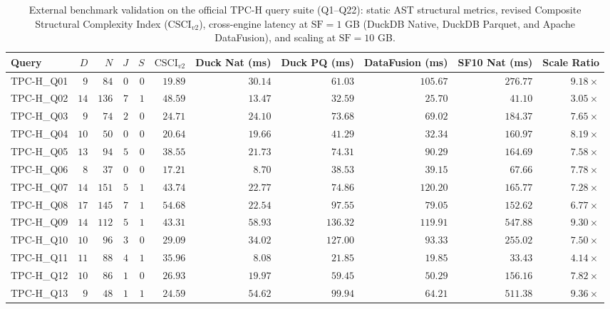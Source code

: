 \begin{table}[htbp]
\centering
\scriptsize
\setlength{\tabcolsep}{4.2pt}
\caption{External benchmark validation on the official TPC-H query suite (Q1--Q22): static AST structural metrics, revised Composite Structural Complexity Index ($\text{CSCI}_{v2}$), cross-engine latency at $\text{SF}=1$ GB (DuckDB Native, DuckDB Parquet, and Apache DataFusion), and scaling at $\text{SF}=10$ GB.}
\label{tab:official_tpch_validation}
\begin{tabular}{@{}lrrrrrrrrrr@{}}
\toprule
\textbf{Query} & \textbf{$D$} & \textbf{$N$} & \textbf{$J$} & \textbf{$S$} & \textbf{$\text{CSCI}_{v2}$} & \textbf{Duck Nat (ms)} & \textbf{Duck PQ (ms)} & \textbf{DataFusion (ms)} & \textbf{SF10 Nat (ms)} & \textbf{Scale Ratio} \\
\midrule
TPC-H\_Q01 & $9$ & $84$ & $0$ & $0$ & $19.89$ & $30.14$ & $61.03$ & $105.67$ & $276.77$ & $9.18\times$ \\
TPC-H\_Q02 & $14$ & $136$ & $7$ & $1$ & $48.59$ & $13.47$ & $32.59$ & $25.70$ & $41.10$ & $3.05\times$ \\
TPC-H\_Q03 & $9$ & $74$ & $2$ & $0$ & $24.71$ & $24.10$ & $73.68$ & $69.02$ & $184.37$ & $7.65\times$ \\
TPC-H\_Q04 & $10$ & $50$ & $0$ & $0$ & $20.64$ & $19.66$ & $41.29$ & $32.34$ & $160.97$ & $8.19\times$ \\
TPC-H\_Q05 & $13$ & $94$ & $5$ & $0$ & $38.55$ & $21.73$ & $74.31$ & $90.29$ & $164.69$ & $7.58\times$ \\
TPC-H\_Q06 & $8$ & $37$ & $0$ & $0$ & $17.21$ & $8.70$ & $38.53$ & $39.15$ & $67.66$ & $7.78\times$ \\
TPC-H\_Q07 & $14$ & $151$ & $5$ & $1$ & $43.74$ & $22.77$ & $74.86$ & $120.20$ & $165.77$ & $7.28\times$ \\
TPC-H\_Q08 & $17$ & $145$ & $7$ & $1$ & $54.68$ & $22.54$ & $97.55$ & $79.05$ & $152.62$ & $6.77\times$ \\
TPC-H\_Q09 & $14$ & $112$ & $5$ & $1$ & $43.31$ & $58.93$ & $136.32$ & $119.91$ & $547.88$ & $9.30\times$ \\
TPC-H\_Q10 & $10$ & $96$ & $3$ & $0$ & $29.09$ & $34.02$ & $127.00$ & $93.33$ & $255.02$ & $7.50\times$ \\
TPC-H\_Q11 & $11$ & $88$ & $4$ & $1$ & $35.96$ & $8.08$ & $21.85$ & $19.85$ & $33.43$ & $4.14\times$ \\
TPC-H\_Q12 & $10$ & $86$ & $1$ & $0$ & $26.93$ & $19.97$ & $59.45$ & $50.29$ & $156.16$ & $7.82\times$ \\
TPC-H\_Q13 & $9$ & $48$ & $1$ & $1$ & $24.59$ & $54.62$ & $99.94$ & $64.21$ & $511.38$ & $9.36\times$ \\

\end{tabular}
\end{table}
